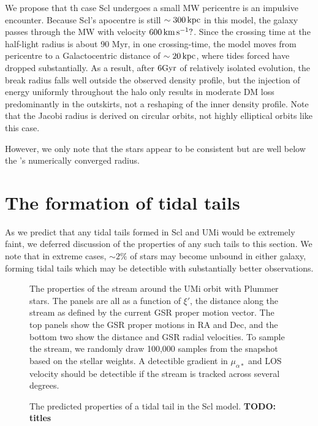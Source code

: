 We propose that th case Scl undergoes a small MW pericentre is an
impulsive encounter. Because Scl's apocentre is still \(\sim 300\,{\rm kpc}\)
in this model, the galaxy passes through the MW with velocity
\(600\,{\rm km\,s^{-1}}?\). Since the crossing time at the half-light radius is
about 90 Myr, in one crossing-time, the model moves from pericentre to a
Galactocentric distance of \(\sim20\,{\rm kpc}\), where tides forced have
dropped substantially. As a result, after \(6{\rm Gyr}\) of relatively
isolated evolution, the break radius falls well outside the observed
density profile, but the injection of energy uniformly throughout the
halo only results in moderate DM loss predominantly in the outskirts,
not a reshaping of the inner density profile. Note that the Jacobi
radius is derived on circular orbits, not highly elliptical orbits like
this case.

However, we only note that the stars appear to be consistent but are
well below the \citet{power+2003}'s numerically converged radius.

\section{The formation of tidal
tails}\label{the-formation-of-tidal-tails}

As we predict that any tidal tails formed in Scl and UMi would be
extremely faint, we deferred discussion of the properties of any such
tails to this section. We note that in extreme cases, \(\sim 2\%\) of
stars may become unbound in either galaxy, forming tidal tails which may
be detectible with substantially better observations.

\begin{figure}
\centering
{}
\caption[Ursa Minor predicted stream]{The properties of the stream
around the UMi \smallperi{} orbit with Plummer stars. The panels are all
as a function of \(\xi'\), the distance along the stream as defined by
the current GSR proper motion vector. The top panels show the GSR proper
motions in RA and Dec, and the bottom two show the distance and GSR
radial velocities. To sample the stream, we randomly draw 100,000
samples from the snapshot based on the stellar weights. A detectible
gradient in \(\mu_{\alpha*}\) and LOS velocity should be detectible if
the stream is tracked across several
degrees.}\label{fig:umi_tidal_stream}
\end{figure}

\begin{figure}
\centering
{}
\caption[Scl predicted stream]{The predicted properties of a tidal tail
in the Scl model. \textbf{TODO: titles}}\label{fig:scl_tidal_stream}
\end{figure}

